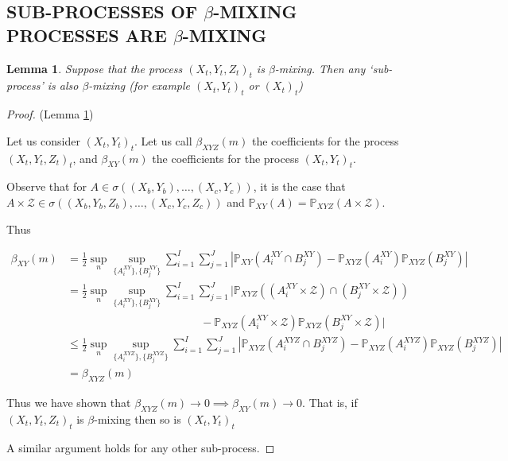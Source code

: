 \documentclass[]{article}
\newtheorem{lemma}{Lemma}
\begin{document}
\subsection{SUB-PROCESSES OF $\beta$-MIXING PROCESSES ARE $\beta$-MIXING}\label{supp:lemma-beta}
\begin{lemma}\label{lemma:beta}
Suppose that the process $(X_t,Y_t,Z_t)_t$ is $\beta$-mixing. Then any `sub-process' is also $\beta$-mixing (for example $(X_t,Y_t)_t$ or $(X_t)_t$)
\end{lemma}
\begin{proof}(Lemma \ref{lemma:beta}) 

Let us consider $(X_t,Y_t)_t$.
Let us call $\beta_{XYZ}(m)$ the coefficients for the process $(X_t,Y_t,Z_t)_t$, and $\beta_{XY}(m)$ the coefficients for the process $(X_t,Y_t)_t$. 

Observe that for $A \in \sigma((X_b,Y_b),\ldots, (X_c,Y_c))$, it is the case that $A \times \mathcal{Z} \in \sigma((X_b,Y_b,Z_b),\ldots, (X_c,Y_c,Z_c))$ and $\mathbb{P}_{XY}(A) = \mathbb{P}_{XYZ}(A\times \mathcal{Z})$.

Thus

\begin{align*}
\beta_{XY}(m) &= \frac{1}{2} \sup_n \sup_{ \{A_i^{XY} \}, \{B_j^{XY} \} } \sum_{i=1}^I \sum_{j=1}^J | \mathbb{P}_{XY}(A_i^{XY} \cap B_j^{XY}) - \mathbb{P}_{XYZ}(A_i^{XY})\mathbb{P}_{XYZ}(B_j^{XY})| \\
&= \frac{1}{2} \sup_n \sup_{ \{A_i^{XY} \}, \{B_j^{XY} \} } \sum_{i=1}^I \sum_{j=1}^J | \mathbb{P}_{XYZ}((A_i^{XY}\times \mathcal{Z}) \cap (B_j^{XY} \times \mathcal{Z})) \\& \quad \quad\quad \quad \quad \quad\quad \quad \quad \quad\quad \quad- \mathbb{P}_{XYZ}(A_i^{XY}\times \mathcal{Z})\mathbb{P}_{XYZ}(B_j^{XY} \times \mathcal{Z})| \\
& \leq \frac{1}{2} \sup_n \sup_{ \{A_i^{XYZ} \}, \{B_j^{XYZ} \} } \sum_{i=1}^I \sum_{j=1}^J | \mathbb{P}_{XYZ}(A_i^{XYZ} \cap B_j^{XYZ}) - \mathbb{P}_{XYZ}(A_i^{XYZ})\mathbb{P}_{XYZ}(B_j^{XYZ})| \\
& = \beta_{XYZ}(m)
\end{align*}

Thus we have shown that  $\beta_{XYZ}(m) \longrightarrow 0 \implies \beta_{XY}(m) \longrightarrow 0$. That is, if  $(X_t,Y_t,Z_t)_t$ is $\beta$-mixing then so is  $(X_t,Y_t)_t$ 

A similar argument holds for any other sub-process.
\end{proof}
\end{document}
